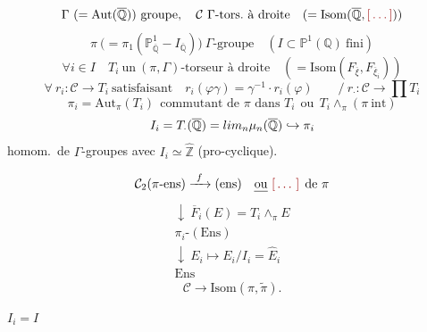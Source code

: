 \documentclass[11pt,a4paper]{article}
\begin{document}
\[
  \Gamma\ (= \mathrm{Aut}(\overline{\mathbb{Q}}))\ \text{groupe},\quad
  \mathcal{C}\ \Gamma\text{-tors.\ à droite}
  \quad (= \mathrm{Isom}(\overline{\mathbb{Q}}, \ill{}))
\]
\[
  \pi\ \bigl(= \pi_{1}(\mathbb{P}^{1}_{\overline{\mathbb{Q}}} - I_{\overline{\mathbb{Q}}})\bigr)
  \ \Gamma\text{-groupe}\quad
  (I \subset \mathbb{P}^{1}(\mathbb{Q})\ \text{fini})
\]
\[
  \forall i \in I\quad T_{i}\ \text{un}\ (\pi, \Gamma)\text{-torseur à droite}
  \quad (= \mathrm{Isom}(F_{\overline{\xi}}, F_{\overline{\xi}_{i}}))
\]
\[
  \forall\ r_{i} : \mathcal{C} \to T_{i}\ \text{satisfaisant}\quad
  r_{i}(\varphi\gamma) = \gamma^{-1} \cdot r_{i}(\varphi)
  \qquad \Big/\ r_{\cdot} : \mathcal{C} \to \textstyle\prod T_{i}
\]
\[
  \pi_{i} = \mathrm{Aut}_{\pi}(T_{i})\ \ \text{commutant de } \pi \text{ dans } T_{i}
  \ \ \text{ou}\ \ T_{i} \wedge_{\pi} (\pi\ \mathrm{int})
\]
\[
  I_{i} = T_{\cdot}(\overline{\mathbb{Q}})
  = \varprojlim_{n} \mu_{n}(\overline{\mathbb{Q}})
  \hookrightarrow \pi_{i}
\]
homom.\ de $\Gamma$-groupes avec $I_{i} \simeq \widehat{\mathbb{Z}}$
(pro-cyclique).

\[
  \mathcal{C}_{2}(\pi\text{-ens}) \xrightarrow{\ f\ } (\mathrm{ens})
  \quad\text{\uncertain{ou} \ill{} de $\pi$}
\]
\[
  \begin{array}{l}
    \downarrow\ \overline{F}_{i}(E) = T_{i} \wedge_{\pi} E\\
    \pi_{i}\text{-}(\mathrm{Ens})\\
    \downarrow\ E_{i} \longmapsto E_{i}/I_{i} = \widehat{E}_{i}\\
    \mathrm{Ens}
  \end{array}
\]
\[
  \mathcal{C} \longrightarrow \mathrm{Isom}(\pi, \widetilde{\pi}).
\]



$I_{i} = I$
\end{document}
